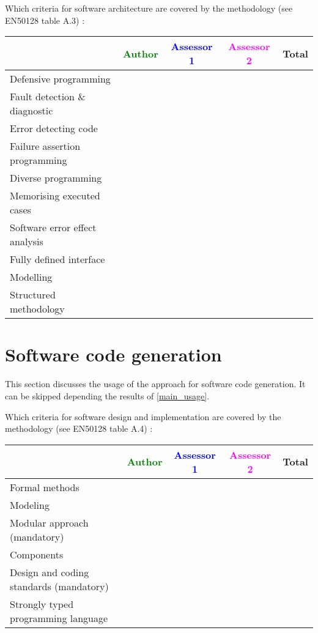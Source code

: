 Which criteria for software architecture are covered by the methodology
(see EN50128 table A.3) :

\begin{tabular}{|l | c | c | c | c|}
\hline
& \textcolor{green}{Author} & \textcolor{blue}{Assessor 1} & \textcolor{magenta}{Assessor 2} & Total \\
\hline
Defensive programming  & & & &  \\
\hline 
Fault detection \& diagnostic  & & & &  \\
\hline
Error detecting code  & & & &  \\
\hline
Failure assertion programming & & & &  \\
\hline
Diverse programming & & & &  \\
\hline
Memorising executed cases & & & &  \\
\hline
Software error effect analysis & & & &  \\
\hline
Fully defined interface & & & &  \\
\hline
Modelling  & & & &  \\
\hline
Structured methodology & & & &  \\
\hline
\end{tabular}

\section{Software code generation}
This section discusses the usage of the approach for software code generation.
It can be skipped depending the results of \ref{main_usage}.

Which criteria for software design and implementation are covered by the methodology
(see EN50128 table A.4) :

\begin{tabular}{|l | c | c | c | c|}
\hline
& \textcolor{green}{Author} & \textcolor{blue}{Assessor 1} & \textcolor{magenta}{Assessor 2} & Total \\
\hline
Formal methods  & & & &  \\
\hline 
Modeling  & & & &  \\
\hline
Modular approach (mandatory) & & & &  \\
\hline
Components & & & &  \\
\hline
Design and coding standards (mandatory) & & & &  \\
\hline
Strongly typed programming language & & & &  \\
\hline

\end{tabular}



